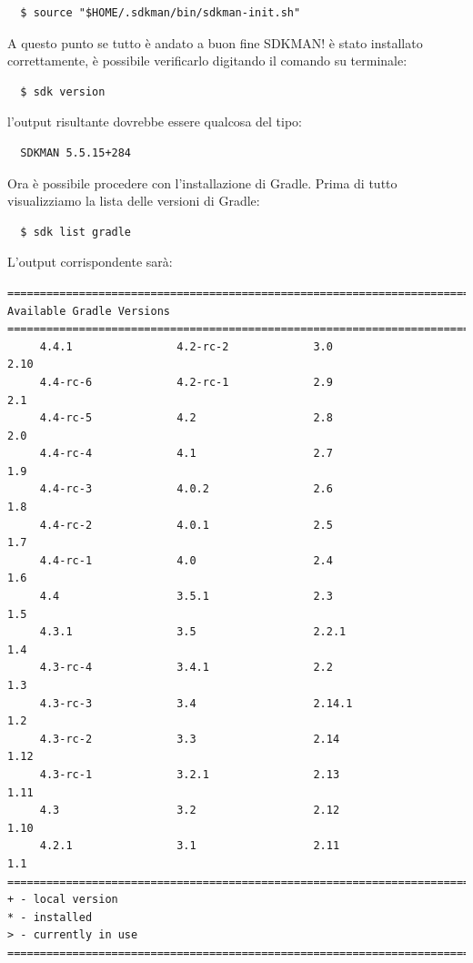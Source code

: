 \documentclass{article}
\begin{document}
\begin{flushleft}
\begin{verbatim}
  $ source "$HOME/.sdkman/bin/sdkman-init.sh"
\end{verbatim}
A questo punto se tutto è andato a buon fine SDKMAN! è stato installato correttamente, è possibile verificarlo digitando il comando su terminale:
\begin{verbatim}
  $ sdk version
\end{verbatim}
l'output risultante dovrebbe essere qualcosa del tipo:
\begin{verbatim}
  SDKMAN 5.5.15+284
\end{verbatim}
Ora è possibile procedere con l'installazione di Gradle. Prima di tutto visualizziamo la lista delle versioni di Gradle:
\begin{verbatim}
  $ sdk list gradle
\end{verbatim}
L'output corrispondente sarà:
\begin{verbatim}
================================================================================
Available Gradle Versions
================================================================================
     4.4.1                4.2-rc-2             3.0                  2.10           
     4.4-rc-6             4.2-rc-1             2.9                  2.1            
     4.4-rc-5             4.2                  2.8                  2.0            
     4.4-rc-4             4.1                  2.7                  1.9            
     4.4-rc-3             4.0.2                2.6                  1.8            
     4.4-rc-2             4.0.1                2.5                  1.7            
     4.4-rc-1             4.0                  2.4                  1.6            
     4.4                  3.5.1                2.3                  1.5            
     4.3.1                3.5                  2.2.1                1.4            
     4.3-rc-4             3.4.1                2.2                  1.3            
     4.3-rc-3             3.4                  2.14.1               1.2            
     4.3-rc-2             3.3                  2.14                 1.12           
     4.3-rc-1             3.2.1                2.13                 1.11           
     4.3                  3.2                  2.12                 1.10           
     4.2.1                3.1                  2.11                 1.1            
================================================================================
+ - local version
* - installed
> - currently in use
================================================================================
\end{verbatim}

\end{flushleft}
\end{document}
